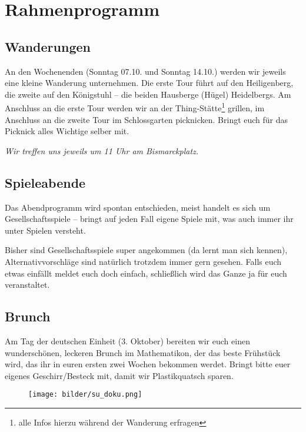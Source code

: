 \section{Rahmenprogramm}
\subsection{Wanderungen}
An den Wochenenden (Sonntag 07.10. und Sonntag 14.10.) werden wir jeweils eine kleine Wanderung unternehmen. Die erste Tour führt auf den Heiligenberg, die zweite auf den Königstuhl -- die beiden Hausberge (Hügel) Heidelbergs. Am Anschluss an die erste Tour werden wir an der Thing-Stätte\footnote{alle Infos hierzu während der Wanderung erfragen} grillen, im Anschluss an die zweite Tour im Schlossgarten picknicken. Bringt euch für das Picknick alles Wichtige selber mit.

\noindent\emph{Wir treffen uns jeweils um 11 Uhr am Bismarckplatz.}

\subsection{Spieleabende}
Das Abendprogramm wird spontan entschieden, meist handelt es sich um Gesellschaftsspiele -- bringt auf jeden Fall eigene Spiele mit, was auch immer ihr unter Spielen versteht. 

Bisher sind Gesellschaftsspiele super angekommen (da lernt man sich kennen), Alternativvorschläge sind natürlich trotzdem immer gern gesehen. Falls euch etwas einfällt meldet euch doch einfach, schließlich wird das Ganze ja für euch veranstaltet.

\subsection{Brunch}
Am Tag der deutschen Einheit (3. Oktober) bereiten wir euch einen wunderschönen, leckeren Brunch im \gls{Mathematikon}, der das beste Frühstück wird, das ihr in euren ersten zwei Wochen bekommen werdet. Bringt bitte euer eigenes Geschirr/Besteck mit, damit wir Plastikquatsch sparen.

\begin{figure}[b]
\centering
\texttt{[image: bilder/su\_doku.png]}
\end{figure}
